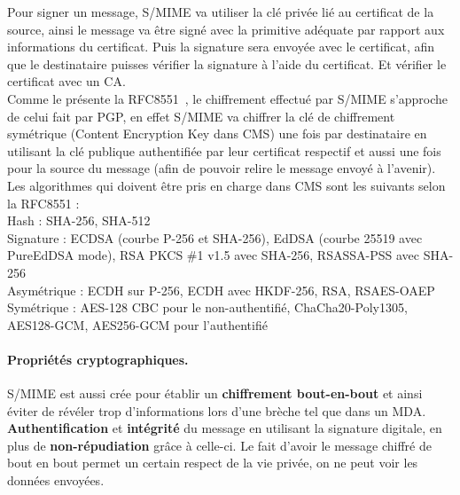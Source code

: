 Pour signer un message, S/MIME va utiliser la clé privée lié au certificat de la source, ainsi le message va être signé avec la primitive adéquate par rapport aux informations du certificat. Puis la signature sera envoyée avec le certificat, afin que le destinataire puisses vérifier la signature à l'aide du certificat. Et vérifier le certificat avec un CA.\\
Comme le présente la RFC8551~\cite{RFC8551}, le chiffrement effectué par S/MIME s'approche de celui fait par PGP, en effet S/MIME va chiffrer la clé de chiffrement symétrique (Content Encryption Key dans CMS) une fois par destinataire en utilisant la clé publique authentifiée par leur certificat respectif et aussi une fois pour la source du message (afin de pouvoir relire le message envoyé à l'avenir). Les algorithmes qui doivent être pris en charge dans CMS sont les suivants selon la RFC8551 :\\
Hash : SHA-256, SHA-512\\
Signature : ECDSA (courbe P-256 et SHA-256), EdDSA (courbe 25519 avec PureEdDSA mode), RSA PKCS \#1 v1.5 avec SHA-256, RSASSA-PSS avec SHA-256\\
Asymétrique : ECDH sur P-256, ECDH avec HKDF-256, RSA, RSAES-OAEP\\
Symétrique : AES-128 CBC pour le non-authentifié, ChaCha20-Poly1305, AES128-GCM, AES256-GCM pour l'authentifié\\
\paragraph*{Propriétés cryptographiques.}
S/MIME est aussi crée pour établir un \textbf{chiffrement bout-en-bout} et ainsi éviter de révéler trop d'informations lors d'une brèche tel que dans un MDA. 
\textbf{Authentification} et \textbf{intégrité} du message en utilisant la signature digitale, en plus de \textbf{non-répudiation} grâce à celle-ci. Le fait d'avoir le message chiffré de bout en bout permet un certain respect de la vie privée, on ne peut voir les données envoyées.
